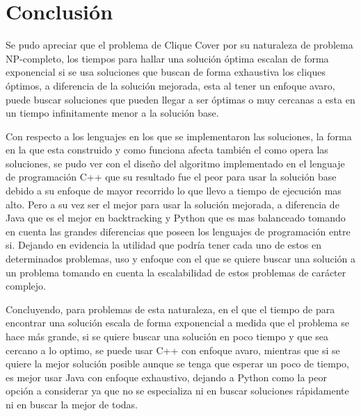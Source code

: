 \section{Conclusión}

Se pudo apreciar que el problema de Clique Cover por su naturaleza de problema NP-completo, los tiempos para hallar una solución óptima escalan de forma exponencial si se usa soluciones que buscan de forma exhaustiva los cliques óptimos, a diferencia de la solución mejorada, esta al tener un enfoque avaro, puede buscar soluciones que pueden llegar a ser óptimas o muy cercanas a esta en un tiempo infinitamente menor a la solución base.

\vspace{0.5 cm}

Con respecto a los lenguajes en los que se implementaron las soluciones, la forma en la que esta construido y como funciona afecta también el como opera las soluciones, se pudo ver con el diseño del algoritmo implementado en el lenguaje de programación C++ que su resultado fue  el peor para usar la solución base debido a su enfoque de mayor recorrido lo que llevo a tiempo de ejecución mas alto. Pero a su vez ser el mejor para usar la solución mejorada, a diferencia de Java que es el mejor en backtracking y Python que es mas balanceado tomando en cuenta las grandes diferencias que poseen los lenguajes de programación entre si. Dejando en evidencia la utilidad que podría tener cada uno de estos en determinados problemas, uso y enfoque con el que se quiere buscar una solución a un problema tomando en cuenta la escalabilidad de estos problemas de carácter complejo.

\vspace{0.5 cm}

Concluyendo, para problemas de esta naturaleza, en el que el tiempo de para encontrar una solución escala de forma exponencial a medida que el problema se hace más grande, si se quiere buscar una solución en poco tiempo y que sea cercano a lo optimo, se puede usar C++ con enfoque avaro, mientras que si se quiere la mejor solución posible aunque se tenga que esperar un poco de tiempo, es mejor usar Java con enfoque exhaustivo, dejando a Python como la peor opción a considerar ya que no se especializa ni en buscar soluciones rápidamente ni en buscar la mejor de todas.